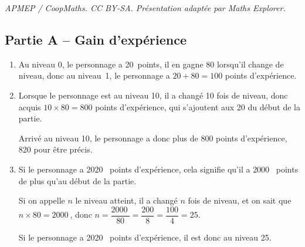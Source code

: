 \documentclass[10pt]{article}
\providecommand{\np}[2][]{{#2~#1}}
\begin{document}
\noindent\textit{APMEP / CoopMaths. CC BY-SA. Présentation adaptée par Maths Explorer.}\par\medskip
\subsection*{Partie A -- Gain d'expérience}
\begin{enumerate}
	\item Au niveau 0, le personnage a 20~points, il en gagne 80 lorsqu'il change de niveau, donc au niveau~1, le personnage a $20+80 = 100$ points d'expérience.

	\item Lorsque le personnage est au niveau 10, il a changé 10 fois de niveau, donc acquis $10\times80 = 800$ points d'expérience, qui s'ajoutent aux 20 du début de la partie.

	Arrivé au niveau 10, le personnage a donc plus de 800 points d'expérience, 820 pour être précis.

	\item Si le personnage a \np{2020} points d'expérience, cela signifie qu'il a \np{2000} points de plus qu'au début de la partie.

	Si on appelle $n$ le niveau atteint, il a changé $n$ fois de niveau, et on sait que \quad $n\times 80 = \np{2000}$, \quad donc $n = \dfrac{\np{2000}}{80} = \dfrac{200}{8} = \dfrac{100}{4} = 25$.

	Si le personnage a \np{2020} points d'expérience, il est donc au niveau 25.
\end{enumerate}
\end{document}
